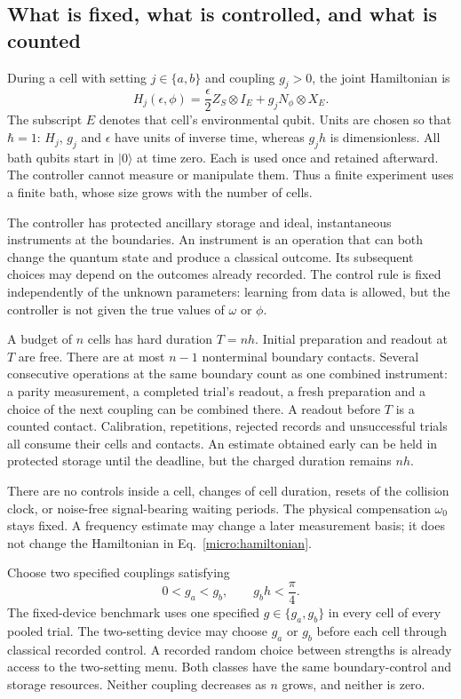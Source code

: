 \documentclass[11pt,a4paper]{article}
\numberwithin{equation}{section}
\theoremstyle{remark}
\begin{document}
\subsection{What is fixed, what is controlled, and what is counted}

During a cell with setting $j\in\{a,b\}$ and coupling $g_j>0$, the joint Hamiltonian is
\begin{equation}
 H_j(\epsilon,\phi)
 =\frac{\epsilon}{2}Z_S\otimes I_E+g_jN_\phi\otimes X_E.
 \label{micro:hamiltonian}
\end{equation}
The subscript $E$ denotes that cell's environmental qubit. Units are chosen
so that $\hbar=1$: $H_j$, $g_j$ and $\epsilon$ have units of inverse time,
whereas $g_jh$ is dimensionless. All bath qubits start in $|0\rangle$ at time
zero. Each is used once and retained afterward. The controller cannot
measure or manipulate them. Thus a finite experiment uses a finite bath,
whose size grows with the number of cells.

The controller has protected ancillary storage and ideal, instantaneous
instruments at the boundaries. An instrument is an operation that can both
change the quantum state and produce a classical outcome. Its subsequent
choices may depend on the outcomes already recorded. The control rule is
fixed independently of the unknown parameters: learning from data is
allowed, but the controller is not given the true values of $\omega$ or
$\phi$.

A budget of $n$ cells has hard duration $T=nh$. Initial preparation and
readout at $T$ are free. There are at most $n-1$ nonterminal boundary
contacts. Several consecutive operations at the same boundary count as
one combined instrument: a parity measurement, a completed trial's
readout, a fresh preparation and a choice of the next coupling can be
combined there. A readout before $T$ is a counted contact. Calibration,
repetitions, rejected records and unsuccessful trials all consume their
cells and contacts. An estimate obtained early can be held in protected
storage until the deadline, but the charged duration remains $nh$.

There are no controls inside a cell, changes of cell duration, resets of
the collision clock, or noise-free signal-bearing waiting periods. The
physical compensation $\omega_0$ stays fixed. A frequency estimate may
change a later measurement basis; it does not change the Hamiltonian in
Eq.~\eqref{micro:hamiltonian}.

Choose two specified couplings satisfying
\begin{equation}
 0<g_a<g_b,\qquad g_bh<\frac{\pi}{4}.
 \label{micro:couplings}
\end{equation}
The fixed-device benchmark uses one specified $g\in\{g_a,g_b\}$ in every
cell of every pooled trial. The two-setting device may choose $g_a$ or
$g_b$ before each cell through classical recorded control. A recorded
random choice between strengths is already access to the two-setting
menu. Both classes have the same boundary-control and storage resources.
Neither coupling decreases as $n$ grows, and neither is zero.
\end{document}
